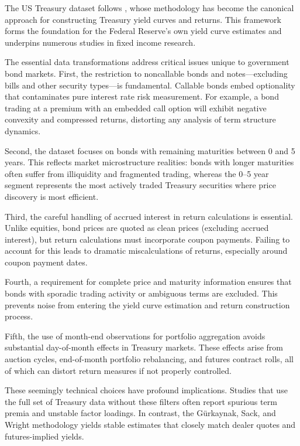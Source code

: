 \documentclass{article}
\begin{document}
\begin{appendices}
The US Treasury dataset follows \cite{Gurkaynak2007}, whose methodology has become the canonical approach for constructing Treasury yield curves and returns. This framework forms the foundation for the Federal Reserve's own yield curve estimates and underpins numerous studies in fixed income research.

The essential data transformations address critical issues unique to government bond markets. First, the restriction to noncallable bonds and notes—excluding bills and other security types—is fundamental. Callable bonds embed optionality that contaminates pure interest rate risk measurement. For example, a bond trading at a premium with an embedded call option will exhibit negative convexity and compressed returns, distorting any analysis of term structure dynamics.

Second, the dataset focuses on bonds with remaining maturities between 0 and 5 years. This reflects market microstructure realities: bonds with longer maturities often suffer from illiquidity and fragmented trading, whereas the 0–5 year segment represents the most actively traded Treasury securities where price discovery is most efficient.

Third, the careful handling of accrued interest in return calculations is essential. Unlike equities, bond prices are quoted as clean prices (excluding accrued interest), but return calculations must incorporate coupon payments. Failing to account for this leads to dramatic miscalculations of returns, especially around coupon payment dates.

Fourth, a requirement for complete price and maturity information ensures that bonds with sporadic trading activity or ambiguous terms are excluded. This prevents noise from entering the yield curve estimation and return construction process.

Fifth, the use of month-end observations for portfolio aggregation avoids substantial day-of-month effects in Treasury markets. These effects arise from auction cycles, end-of-month portfolio rebalancing, and futures contract rolls, all of which can distort return measures if not properly controlled.

These seemingly technical choices have profound implications. Studies that use the full set of Treasury data without these filters often report spurious term premia and unstable factor loadings. In contrast, the Gürkaynak, Sack, and Wright methodology yields stable estimates that closely match dealer quotes and futures-implied yields.


\end{appendices}
\end{document}
